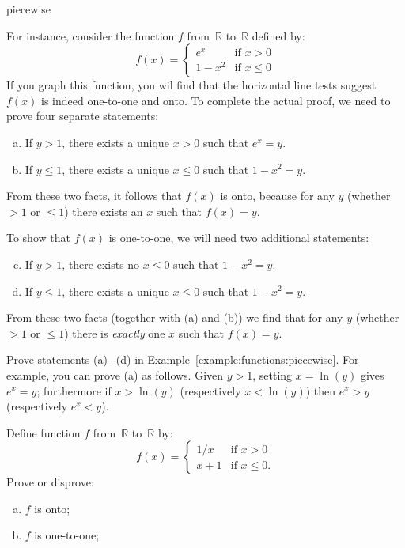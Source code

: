 \begin{example}{piecewise}

  For instance, consider the function $f$ from~$\mathbb{R}$ to~$\mathbb{R}$ defined by:
$$ f(x) = 
\begin{cases}
e^x & \mbox{if $x > 0$} \\
1 - x^2 & \mbox{if $x \le 0$}
\end{cases} $$
If you graph this function, you wil find that the horizontal line tests suggest $f(x)$ is indeed one-to-one and onto. To complete the actual proof, we need to prove four separate statements:
\begin{enumerate}[(a)] 
\item
If $y > 1$, there exists a unique $x>0$ such that $e^x = y$.
\item
If $y \le 1$, there exists a unique $x \le 0$ such that $1-x^2 = y$.
\end{enumerate}
From these two facts, it follows that $f(x)$ is onto, because for any $y$ (whether $>1$ or $\le 1$) there exists an $x$ such that $f(x)=y$. 
\bigskip


To show that $f(x)$ is one-to-one, we will need two additional statements:
\begin{enumerate}[(a)]
\setcounter{enumi}{2} 
\item
If $y > 1$, there exists no $x\le0$ such that $1 - x^2 = y$.
\item
If $y \le 1$, there exists a unique $x \le 0$ such that $1-x^2 = y$.
\end{enumerate}
From these two facts (together with (a) and (b)) we find that for any $y$ (whether $>1$ or $\le 1$) there is \emph{exactly} one $x$ such that $f(x)=y$.
\end{example}
 
\begin{exercise}{}
Prove statements (a)$-$(d) in Example~\ref{example:functions:piecewise}.  For example, you can prove (a)  as follows. Given $y>1$, setting $x = \ln(y)$ gives $e^x = y$; furthermore if $x > \ln(y)$ (respectively  $x < \ln(y)$) then $e^x > y$ (respectively $e^x < y$).
\end{exercise}



\begin{exercise}{} \label{OntoCasesExer}
 Define function $f$  from~$\mathbb{R}$ to~$\mathbb{R}$ by:
$$ f(x) = 
\begin{cases}
1/x & \mbox{if $x > 0$} \\
x + 1 & \mbox{if $x \le 0$.}
\end{cases} $$
Prove or disprove:
\begin{multicols}{2}
 \begin{enumerate}[(a)]
 \item \label{OntoCasesExer-fOnto}
 $f$ is onto;
 \item \label{OntoCasesExer-fNot11}
 $f$ is one-to-one;
\end{enumerate}
\end{multicols}
\end{exercise}

